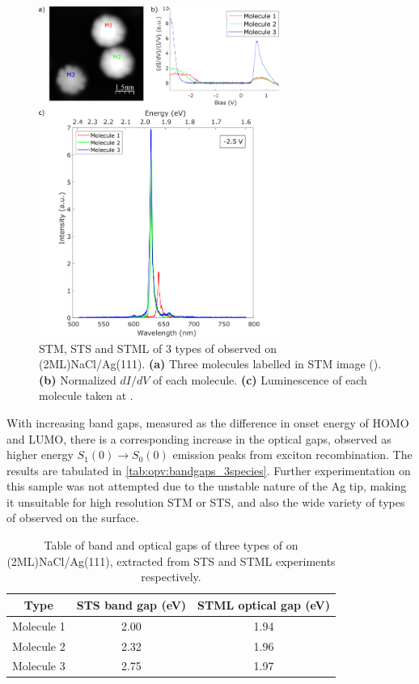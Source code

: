 \begin{figure} [H]
    \centering
        \includegraphics[width=0.7\textwidth]{pictures/3species_diagram.png}
        \caption{STM, STS and STML of 3 types of  observed on (2ML)NaCl/Ag(111). \textbf{(a)} Three molecules labelled in STM image (). \textbf{(b)} Normalized $dI/dV$ of each molecule. \textbf{(c)} Luminescence of each molecule taken at . }
    \label{fig:opv:f8znpc-sts_stml}
\end{figure}


With increasing band gaps, measured as the difference in onset energy of HOMO and LUMO, there is a corresponding increase in the optical gaps, observed as higher energy $S_1(0) \rightarrow S_0(0)$ emission peaks from exciton recombination. The results are tabulated in \autoref{tab:opv:bandgaps_3species}. Further experimentation on this sample was not attempted due to the unstable nature of the Ag tip, making it unsuitable for high resolution \ac{STM} or \ac{STS}, and also the wide variety of types of  observed on the surface.
 
 \begin{table}[H]
\begin{center}
    \begin{tabular}{|c|c|c|} 
    \hline
        Type  & STS band gap (eV)  &  STML optical gap (eV) \\
        \hline
        Molecule 1  &    2.00   & 1.94   \\
        Molecule 2  &    2.32   & 1.96 \\
        Molecule 3  &    2.75   & 1.97 \\
        \hline
    \end{tabular}
    \caption{Table of band and optical gaps of three types of  on (2ML)NaCl/Ag(111), extracted from STS and STML experiments respectively.}
    \label{tab:opv:bandgaps_3species}
    \end{center}
\end{table}


